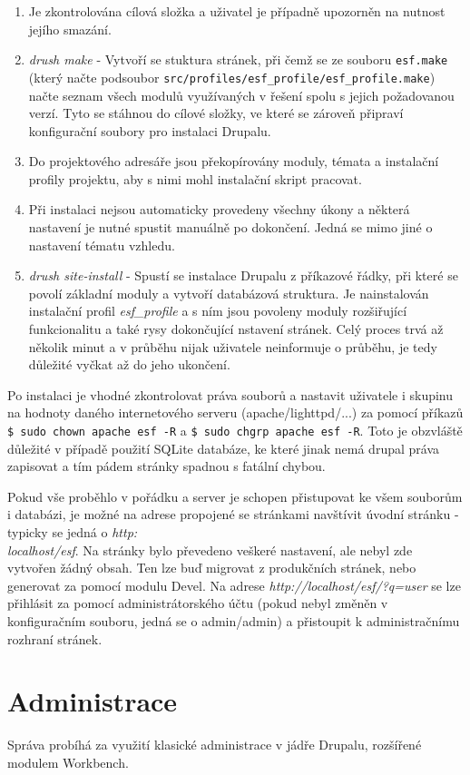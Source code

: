 \begin{enumerate}
  \item Je zkontrolována cílová složka a uživatel je případně upozorněn na nutnost jejího smazání.
  \item \emph{drush make} - Vytvoří se stuktura stránek, při čemž se ze souboru \texttt{esf.make} (který načte podsoubor \texttt{src/profiles/esf\_profile/esf\_profile.make}) načte seznam všech modulů využívaných v řešení spolu s jejich požadovanou verzí. Tyto se stáhnou do cílové složky, ve které se zároveň připraví konfigurační soubory pro instalaci Drupalu.
  \item Do projektového adresáře jsou překopírovány moduly, témata a instalační profily projektu, aby s nimi mohl instalační skript pracovat.
  \item Při instalaci nejsou automaticky provedeny všechny úkony a některá nastavení je nutné spustit manuálně po dokončení. Jedná se mimo jiné o nastavení tématu vzhledu.
  \item \emph{drush site-install} - Spustí se instalace Drupalu z příkazové řádky, při které se povolí základní moduly a vytvoří databázová struktura. Je nainstalován instalační profil \emph{esf\_profile} a s ním jsou povoleny moduly rozšiřující funkcionalitu a také rysy dokončující nstavení stránek. Celý proces trvá až několik minut a v průběhu nijak uživatele neinformuje o průběhu, je tedy důležité vyčkat až do jeho ukončení.
\end{enumerate}

Po instalaci je vhodné zkontrolovat práva souborů a nastavit uživatele i skupinu na hodnoty daného internetového serveru (apache/lighttpd/...) za pomocí příkazů \texttt{\$~sudo~chown~apache~esf~-R} a \texttt{\$~sudo~chgrp~apache~esf~-R}. Toto je obzvláště důležité v případě použití SQLite databáze, ke které jinak nemá drupal práva zapisovat a tím pádem stránky spadnou s fatální chybou. 

Pokud vše proběhlo v pořádku a server je schopen přistupovat ke všem souborům i databázi, je možné na adrese propojené se stránkami navštívit úvodní stránku - typicky se jedná o \emph{http:\\localhost/esf}. Na stránky bylo převedeno veškeré nastavení, ale nebyl zde vytvořen žádný obsah. Ten lze buď migrovat z produkčních stránek, nebo generovat za pomocí modulu Devel. Na adrese \emph{http://localhost/esf/?q=user} se lze přihlásit za pomocí administrátorského účtu (pokud nebyl změněn v konfiguračním souboru, jedná se o admin/admin) a přistoupit k administračnímu rozhraní stránek.

\section{Administrace}
Správa probíhá za využití klasické administrace v jádře Drupalu, rozšířené modulem Workbench. 
